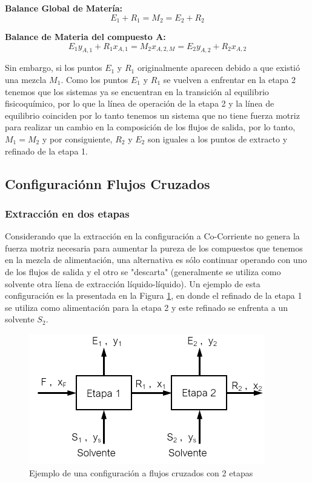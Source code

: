 \documentclass[11pt]{book}
\begin{document}
\textbf{Balance Global de Matería:}
\begin{equation}
    \label{eq:ExtraccionLiqLiqCocorriente_3}
    E_1 + R_1 = M_2 = E_2 + R_2
\end{equation}

\textbf{Balance de Materia del compuesto A:}
\begin{equation}
    \label{eq:ExtraccionLiqLiqCocorriente_4}
    E_1 y_{A,1} + R_1 x_{A,1} = M_2 x_{A,2,M} = E_2 y_{A,2} + R_2 x_{A,2}
\end{equation}

Sin embargo, si los puntos $E_1$ y $R_1$ originalmente aparecen debido a que existió una mezcla $M_1$. Como los puntos $E_1$ y $R_1$ se vuelven a enfrentar en la etapa 2 tenemos que los sistemas ya se encuentran en la transición al equilibrio fisicoquímico, por lo que la línea de operación de la etapa 2 y la línea de equilibrio coinciden por lo tanto tenemos un sistema que no tiene fuerza motriz para realizar un cambio en la composición de los flujos de salida, por lo tanto, $M_1 = M_2$ y por consiguiente, $R_2$ y $E_2$ son iguales a los puntos de extracto y refinado de la etapa 1.

\subsection{Configuraciónn Flujos Cruzados}

\subsubsection{Extracción en dos etapas}

Considerando que la extracción en la configuración a Co-Corriente no genera la fuerza motriz necesaria para aumentar la pureza de los compuestos que tenemos en la mezcla de alimentación, una alternativa es sólo continuar operando con uno de los flujos de salida y el otro se "descarta" (generalmente se utiliza como solvente otra líena de extracción líquido-líquido). Un ejemplo de esta configuración es la presentada en la Figura \ref{fig:ExtraccionLiqLiqCruzado_1}, en donde el refinado de la etapa 1 se utiliza como alimentación para la etapa 2 y este refinado se enfrenta a un solvente $S_2$.

\begin{figure}
    \centering
    \includegraphics{img/LiquidoLiquido/ExtracionLiqLiqCruzado_1.PNG}
    \caption{Ejemplo de una configuración a flujos cruzados con 2 etapas}
    \label{fig:ExtraccionLiqLiqCruzado_1}
\end{figure}
\end{document}
